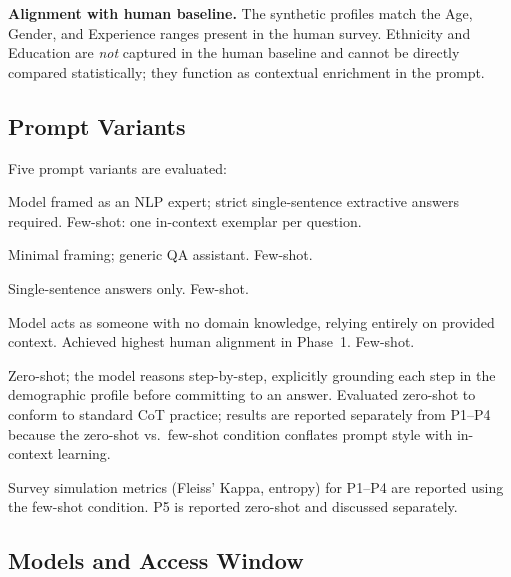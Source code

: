 \documentclass[12pt,a4paper]{article}
\begin{document}
\textbf{Alignment with human baseline.}
The synthetic profiles match the Age, Gender, and Experience ranges
present in the human survey.
Ethnicity and Education are \emph{not} captured in the human baseline
and cannot be directly compared statistically; they function as
contextual enrichment in the prompt.

\subsection{Prompt Variants}
\label{sec:method:prompts}

Five prompt variants are evaluated:

\begin{description}[leftmargin=1.3em,itemsep=2pt]
\item[\textbf{P1 (Expert NLP).}] Model framed as an NLP expert;
  strict single-sentence extractive answers required.
  Few-shot: one in-context exemplar per question.
\item[\textbf{P2 (Plain QA).}] Minimal framing; generic QA assistant.
  Few-shot.
\item[\textbf{P3 (Concise).}] Single-sentence answers only.
  Few-shot.
\item[\textbf{P4 (Novice Persona).}] Model acts as someone with no
  domain knowledge, relying entirely on provided context.
  Achieved highest human alignment in Phase~1. Few-shot.
\item[\textbf{P5 (Chain-of-Thought).}] Zero-shot; the model reasons
  step-by-step, explicitly grounding each step in the demographic
  profile before committing to an answer. Evaluated zero-shot to
  conform to standard CoT practice; results are reported separately
  from P1--P4 because the zero-shot vs.\ few-shot condition
  conflates prompt style with in-context learning.
\end{description}

Survey simulation metrics (Fleiss' Kappa, entropy) for P1--P4 are
reported using the few-shot condition. P5 is reported zero-shot and
discussed separately.

\subsection{Models and Access Window}
\label{sec:method:models}
\end{document}
